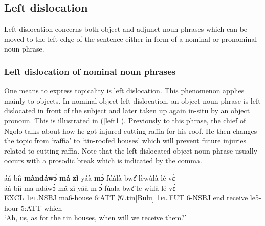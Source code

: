 







\subsection{Left dislocation}
\label{sec:leftdis}

Left dislocation concerns both object and adjunct noun phrases which can be moved to the left edge of the sentence either in form of a nominal or pronominal noun phrase.


\subsubsection{Left dislocation of nominal noun phrases}
\label{sec:leftdisN}

One means to express topicality is left dislocation. This phenomenon applies mainly to objects.
In nominal object left dislocation, an object noun phrase is left dislocated in front of the subject and later taken up again in-situ by an object pronoun. This is illustrated in (\ref{left1}). Previously to this phrase, the chief of Ngolo talks about how he got injured cutting raffia for his roof. He then changes the topic from `raffia' to `tin-roofed houses' which will prevent future injuries related to cutting raffia. Note that the left dislocated object noun phrase usually occurs with a prosodic break which is indicated by the comma.

\begin{exe} 
\ex\label{left1}
  \glll     áá bíì {\bfseries màndáwɔ̀} {\bfseries má} {\bfseries zì} yáà {\bfseries mɔ́} fúàlà bwɛ̂ lèwùlà lé vɛ́\\
          áá bíì ma-ndáwɔ̀ má zì yáà m-ɔ́ fúala bwɛ̂ le-wùlà lé vɛ́\\
              EXCL 1\textsc{pl}.NSBJ ma6-house 6:ATT $\emptyset$7.tin[Bulu] 1\textsc{pl}.FUT 6-NSBJ end receive le5-hour 5:ATT which \\
    \trans `Ah, us, as for the tin houses, when will we receive them?'
\end{exe}

